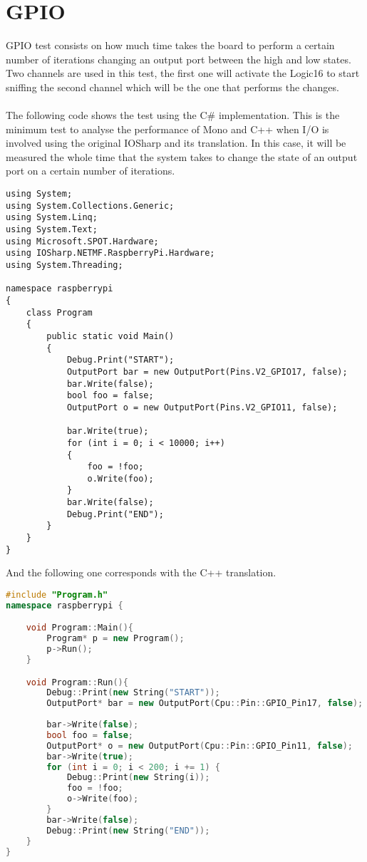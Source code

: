 \section{GPIO}\label{SS:IOEx-GPIO}
GPIO test consists on how much time takes the board to perform a certain number of iterations changing an output port between the high and low states. Two channels are used in this test, the first one will activate the Logic16 to start sniffing the second channel which will be the one that performs the changes. 
\\
\\
The following code shows the test using the C\# implementation. This is the minimum test to analyse the performance of Mono and C++ when I/O is involved using the original IOSharp and its translation. In this case, it will be measured the whole time that the system takes to change the state of an output port on a certain number of iterations.
\begin{lstlisting}[language=CSharp, caption={GPIO Performance test in C\#}]
using System;
using System.Collections.Generic;
using System.Linq;
using System.Text;
using Microsoft.SPOT.Hardware;
using IOSharp.NETMF.RaspberryPi.Hardware;
using System.Threading;

namespace raspberrypi
{
    class Program
    {
        public static void Main()
        {
            Debug.Print("START");
            OutputPort bar = new OutputPort(Pins.V2_GPIO17, false);
            bar.Write(false);
            bool foo = false;
            OutputPort o = new OutputPort(Pins.V2_GPIO11, false);

            bar.Write(true);
            for (int i = 0; i < 10000; i++)
            {
                foo = !foo;
                o.Write(foo);
            }
            bar.Write(false);
            Debug.Print("END");
        }
    }
}
\end{lstlisting}
And the following one corresponds with the C++ translation.
\begin{lstlisting}[language=C++, caption={GPIO Performance translated to C++}]
#include "Program.h"
namespace raspberrypi {

	void Program::Main(){
		Program* p = new Program();
		p->Run();
	}

	void Program::Run(){
		Debug::Print(new String("START"));
		OutputPort* bar = new OutputPort(Cpu::Pin::GPIO_Pin17, false);
	
		bar->Write(false);
		bool foo = false;
		OutputPort* o = new OutputPort(Cpu::Pin::GPIO_Pin11, false);
		bar->Write(true);
		for (int i = 0; i < 200; i += 1) {
			Debug::Print(new String(i));
			foo = !foo;
			o->Write(foo);
		}
		bar->Write(false);
		Debug::Print(new String("END"));
	}
}
\end{lstlisting}

